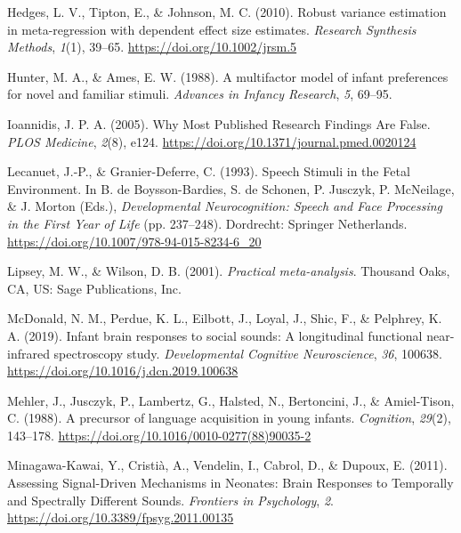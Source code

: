 \documentclass[
  man,mask,floatsintext]{apa6}
\newlength{\cslhangindent}
\newlength{\cslentryspacingunit} %
\newenvironment{CSLReferences}[2] %
 {%
  \setlength{\parindent}{0pt}
  \ifodd #1
  \let\oldpar\par
  \def\par{\hangindent=\cslhangindent\oldpar}
  \fi
  \setlength{\parskip}{#2\cslentryspacingunit}
 }%
 {}
\begin{document}
\begin{CSLReferences}{1}{0}
\leavevmode{}%
Hedges, L. V., Tipton, E., \& Johnson, M. C. (2010). Robust variance estimation in meta-regression with dependent effect size estimates. \emph{Research Synthesis Methods}, \emph{1}(1), 39--65. \url{https://doi.org/10.1002/jrsm.5}

\leavevmode{}%
Hunter, M. A., \& Ames, E. W. (1988). A multifactor model of infant preferences for novel and familiar stimuli. \emph{Advances in Infancy Research}, \emph{5}, 69--95.

\leavevmode{}%
Ioannidis, J. P. A. (2005). Why {Most} {Published} {Research} {Findings} {Are} {False}. \emph{PLOS Medicine}, \emph{2}(8), e124. \url{https://doi.org/10.1371/journal.pmed.0020124}

\leavevmode{}%
Lecanuet, J.-P., \& Granier-Deferre, C. (1993). Speech {Stimuli} in the {Fetal} {Environment}. In B. de Boysson-Bardies, S. de Schonen, P. Jusczyk, P. McNeilage, \& J. Morton (Eds.), \emph{Developmental {Neurocognition}: {Speech} and {Face} {Processing} in the {First} {Year} of {Life}} (pp. 237--248). Dordrecht: Springer Netherlands. \url{https://doi.org/10.1007/978-94-015-8234-6_20}

\leavevmode{}%
Lipsey, M. W., \& Wilson, D. B. (2001). \emph{Practical meta-analysis}. Thousand Oaks, CA, US: Sage Publications, Inc.

\leavevmode{}%
McDonald, N. M., Perdue, K. L., Eilbott, J., Loyal, J., Shic, F., \& Pelphrey, K. A. (2019). Infant brain responses to social sounds: {A} longitudinal functional near-infrared spectroscopy study. \emph{Developmental Cognitive Neuroscience}, \emph{36}, 100638. \url{https://doi.org/10.1016/j.dcn.2019.100638}

\leavevmode{}%
Mehler, J., Jusczyk, P., Lambertz, G., Halsted, N., Bertoncini, J., \& Amiel-Tison, C. (1988). A precursor of language acquisition in young infants. \emph{Cognition}, \emph{29}(2), 143--178. \url{https://doi.org/10.1016/0010-0277(88)90035-2}

\leavevmode{}%
Minagawa-Kawai, Y., Cristià, A., Vendelin, I., Cabrol, D., \& Dupoux, E. (2011). Assessing {Signal}-{Driven} {Mechanisms} in {Neonates}: {Brain} {Responses} to {Temporally} and {Spectrally} {Different} {Sounds}. \emph{Frontiers in Psychology}, \emph{2}. \url{https://doi.org/10.3389/fpsyg.2011.00135}


\end{CSLReferences}
\end{document}
